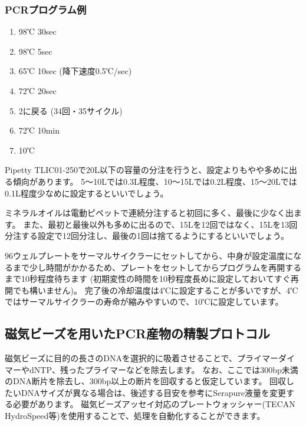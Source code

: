 \documentclass[titlepage,10pt,a4paper,uplatex]{jsbook}
\begin{document}
\subsubsection{PCRプログラム例}
\begin{enumerate}
\item 98℃ 30sec
\item 98℃ 5sec
\item 65℃ 10sec (降下速度0.5℃/sec)
\item 72℃ 20sec
\item 2に戻る (34回・35サイクル)
\item 72℃ 10min
\item 10℃
\end{enumerate}

Pipetty TLIC01-250で20{\textmu}L以下の容量の分注を行うと、設定よりもやや多めに出る傾向があります。
5～10{\textmu}Lでは0.3{\textmu}L程度、10～15{\textmu}Lでは0.2{\textmu}L程度、15～20{\textmu}Lでは0.1{\textmu}L程度少なめに設定するといいでしょう。

ミネラルオイルは電動ピペットで連続分注すると初回に多く、最後に少なく出ます。
また、最初と最後以外も多めに出るので、15{\textmu}Lを12回ではなく、15{\textmu}Lを13回分注する設定で12回分注し、最後の1回は捨てるようにするといいでしょう。

96ウェルプレートをサーマルサイクラーにセットしてから、中身が設定温度になるまで少し時間がかかるため、プレートをセットしてからプログラムを再開するまで10秒程度待ちます (初期変性の時間を10秒程度長めに設定しておいてすぐ再開でも構いません)。
完了後の冷却温度は4℃に設定することが多いですが、4℃ではサーマルサイクラーの寿命が縮みやすいので、10℃に設定しています。

\subsection{磁気ビーズを用いたPCR産物の精製プロトコル}

磁気ビーズに目的の長さのDNAを選択的に吸着させることで、プライマーダイマーやdNTP、残ったプライマーなどを除去します。
なお、ここでは300bp未満のDNA断片を除去し、300bp以上の断片を回収すると仮定しています。
回収したいDNAサイズが異なる場合は、後述する目安を参考にSerapure液量を変更する必要があります。
磁気ビーズアッセイ対応のプレートウォッシャー(TECAN HydroSpeed等)を使用することで、処理を自動化することができます。
\end{document}

